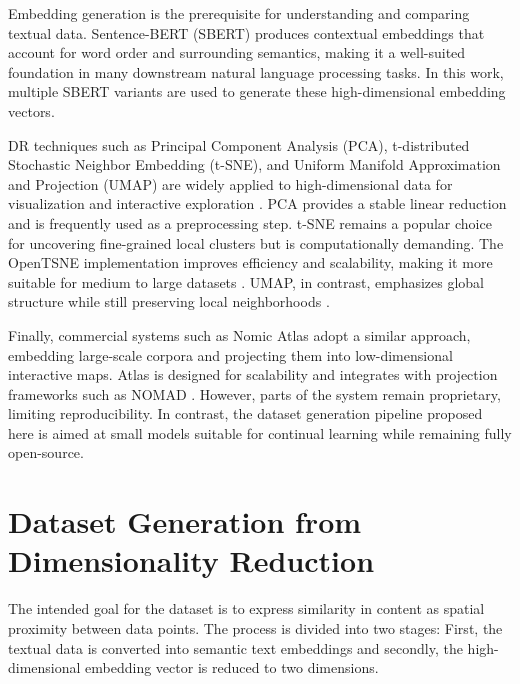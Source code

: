 Embedding generation is the prerequisite for understanding and comparing textual data. Sentence-BERT (SBERT) \cite{reimersSentenceBERTSentenceEmbeddings2019a} produces contextual embeddings that account for word order and surrounding semantics, making it a well-suited foundation in many downstream natural language processing tasks. In this work, multiple SBERT variants are used to generate these high-dimensional embedding vectors.

DR techniques such as Principal Component Analysis (PCA), t-distributed Stochastic Neighbor Embedding (t-SNE), and Uniform Manifold Approximation and Projection (UMAP) are widely applied to high-dimensional data for visualization and interactive exploration \cite{smilkovEmbeddingProjectorInteractive2016}. PCA provides a stable linear reduction and is frequently used as a preprocessing step. t-SNE remains a popular choice for uncovering fine-grained local clusters but is computationally demanding. The OpenTSNE implementation improves efficiency and scalability, making it more suitable for medium to large datasets \cite{policarOpenTSNEModularPython2024}. UMAP, in contrast, emphasizes global structure while still preserving local neighborhoods \cite{mcinnesUMAPUniformManifold2020a}.

Finally, commercial systems such as Nomic Atlas \cite{duderstadtAtlasWhitepaperScalable} adopt a similar approach, embedding large-scale corpora and projecting them into low-dimensional interactive maps. Atlas is designed for scalability and integrates with projection frameworks such as NOMAD \cite{nussbaumNomicEmbedTraining2025}. However, parts of the system remain proprietary, limiting reproducibility. In contrast, the dataset generation pipeline proposed here is aimed at small models suitable for continual learning while remaining fully open-source.

\section{Dataset Generation from Dimensionality Reduction }
\label{sec:main}

The intended goal for the dataset is to express similarity in content as spatial proximity between data points. The process is divided into two stages: First, the textual data is converted into semantic text embeddings and secondly, the high-dimensional embedding vector is reduced to two dimensions.

